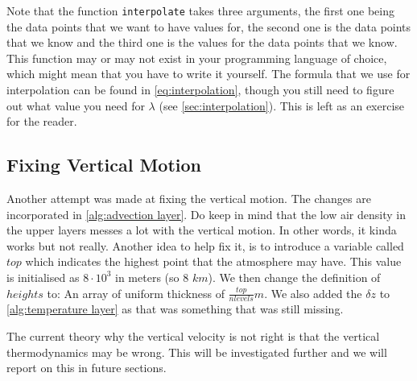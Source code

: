 Note that the function \texttt{interpolate} takes three arguments, the first one being the data points that we want to have values for, the second one is the data points that we know and the 
third one is the values for the data points that we know. This function may or may not exist in your programming language of choice, which might mean that you have to write it yourself. 
The formula that we use for interpolation can be found in \autoref{eq:interpolation}, though you still need to figure out what value you need for $\lambda$ (see \autoref{sec:interpolation}). 
This is left as an exercise for the reader.

\subsection{Fixing Vertical Motion}
Another attempt was made at fixing the vertical motion. The changes are incorporated in \autoref{alg:advection layer}. Do keep in mind that the low air density in the upper layers messes a lot 
with the vertical motion. In other words, it kinda works but not really. Another idea to help fix it, is to introduce a variable called $top$ which indicates the highest point that the 
atmosphere may have. This value is initialised as $8 \cdot 10^3$ in meters (so 8 $km$). We then change the definition of $heights$ to: An array of uniform thickness of $\frac{top}{nlevels} m$.
We also added the $\delta z$ to \autoref{alg:temperature layer} as that was something that was still missing.

The current theory why the vertical velocity is not right is that the vertical thermodynamics may be wrong. This will be investigated further and we will report on this in future sections.